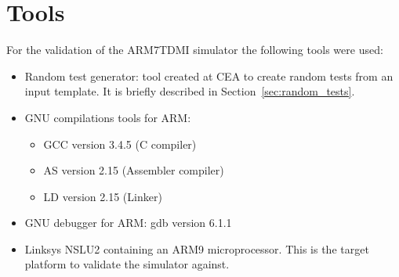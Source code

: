 \section{Tools}
\label{sec:tools}

For the validation of the ARM7TDMI simulator the following tools were used:
\begin{itemize}
	\item Random test generator: tool created at CEA to create random tests from an input template. It is briefly described in Section~\ref{sec:random_tests}.
	\item GNU compilations tools for ARM:
	\begin{itemize}
		\item GCC version 3.4.5 (C compiler)
		\item AS version 2.15 (Assembler compiler)
		\item LD version 2.15 (Linker)
	\end{itemize}
	\item GNU debugger for ARM: gdb version 6.1.1
	\item Linksys NSLU2 containing an ARM9 microprocessor. This is the target platform to validate the simulator against.
\end{itemize}

